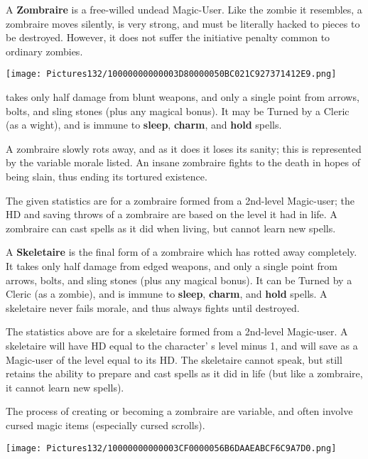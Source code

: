 \documentclass[a4paper,twoside,openany,10pt]{book}
\begin{document}
\begin{multicols}{2}
A \textbf{Zombraire} is a free-willed undead Magic-User. Like the zombie it resembles, a zombraire moves silently, is very strong, and must be literally hacked to pieces to be destroyed. However, it does not suffer the initiative penalty common to ordinary zombies.

\begin{center}
		\texttt{[image: Pictures132/10000000000003D80000050BC021C927371412E9.png]} \end{center}

takes only half damage from blunt weapons, and only a single point from arrows, bolts, and sling stones (plus any magical bonus). It may be Turned by a Cleric (as a wight), and is immune to \textbf{sleep},\textbf{ charm},\textbf{ }and\textbf{ hold} spells.

A zombraire slowly rots away, and as it does it loses its sanity; this is represented by the variable morale listed. An insane zombraire fights to the death in hopes of being slain, thus ending its tortured existence.

The given statistics are for a zombraire formed from a 2nd-level Magic-user; the HD and saving throws of a zombraire are based on the level it had in life. A zombraire can cast spells as it did when living, but cannot learn new spells.

A \textbf{Skeletaire} is the final form of a zombraire which has rotted away completely. It takes only half damage from edged weapons, and only a single point from arrows, bolts, and sling stones (plus any magical bonus). It can be Turned by a Cleric (as a zombie), and is immune to \textbf{sleep},\textbf{ charm}, and \textbf{hold} spells. A skeletaire never fails morale, and thus always fights until destroyed.

The statistics above are for a skeletaire formed from a 2nd-level Magic-user. A skeletaire will have HD equal to the character' s level minus 1, and will save as a Magic-user of the level equal to its HD. The skeletaire cannot speak, but still retains the ability to prepare and cast spells as it did in life (but like a zombraire, it cannot learn new spells). 

The process of creating or becoming a zombraire are variable, and often involve cursed magic items (especially cursed scrolls).

\end{multicols}

 \begin{center}
 \texttt{[image: Pictures132/10000000000003CF0000056B6DAAEABCF6C9A7D0.png]}
 \end{center}
\end{document}
